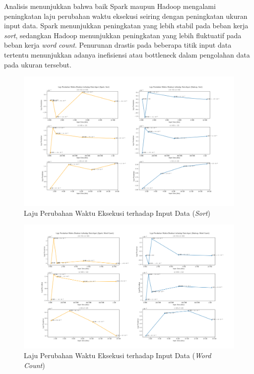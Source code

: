 Analisis menunjukkan bahwa baik Spark maupun Hadoop mengalami peningkatan laju perubahan waktu eksekusi seiring dengan peningkatan ukuran input data. Spark menunjukkan peningkatan yang lebih stabil pada beban kerja \textit{sort}, sedangkan Hadoop menunjukkan peningkatan yang lebih fluktuatif pada beban kerja \textit{word count}. Penurunan drastis pada beberapa titik input data tertentu menunjukkan adanya inefisiensi atau bottleneck dalam pengolahan data pada ukuran tersebut.


\begin{landscape}
\begin{figure}[h]
    \centering
    \includegraphics[height=0.6\linewidth]{figures/ch04/3-0-dur-sort.png}
    \caption{Laju Perubahan Waktu Eksekusi terhadap Input Data (\textit{Sort})}
    \label{fig:3-0-dur-sort}
\end{figure}
\end{landscape}

\begin{landscape}
\begin{figure}[h]
    \centering
    \includegraphics[height=0.6\linewidth]{figures/ch04/3-0-dur-wc.png}
    \caption{Laju Perubahan Waktu Eksekusi terhadap Input Data (\textit{Word Count})}
    \label{fig:3-0-dur-wc}
\end{figure}
\end{landscape}

